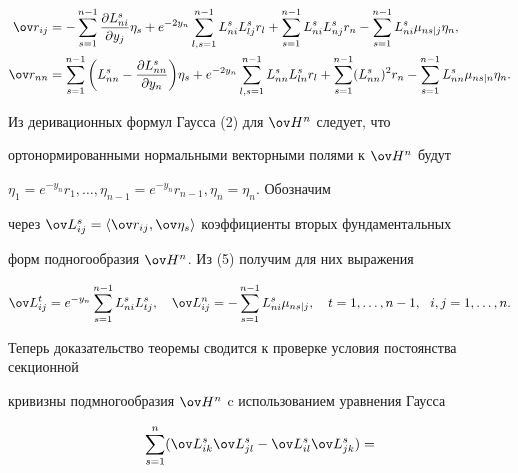 \begin{pf}
\begin{equation}
\begin{split}


\ov r_{ij}&=-\sum^{n-1}_{s=1}\frac{\partial L^s_{ni}}{\partial y_j}\eta_s


+e^{-2y_n}\sum_{l,s=1}^{n-1}L^s_{ni}L^s_{lj}r_l+\sum^{n-1}_{s=1}


L^s_{ni}L^s_{nj}r_n-\sum^{n-1}_{s=1}L^s_{ni}\mu_{ns|j}\eta_n,\\


%


\ov r_{nn}&=\sum^{n-1}_{s=1}\bigg(L^s_{nn}-


\frac{\partial L^s_{nn}}{\partial y_n}\bigg)\eta_s+


e^{-2y_n}\sum_{l,s=1}^{n-1}L^s_{nn}L^s_{ln}r_l+


\sum^{n-1}_{s=1}(L^s_{nn})^2 r_n-\sum_{s=1}^{n-1}L^s_{nn}\mu_{ns|n}\eta_n.


\end{split}


\end{equation}





Из деривационных формул Гаусса (2) для $\ov H{}^n$ следует, что 


ортонормированными нормальными векторными полями к $\ov H{}^n$ будут 


$\eta_1=e^{-y_n}r_1,\dotsc,\eta_{n-1}=e^{-y_n}r_{n-1},\eta_n=\eta_n$. Обозначим 


через $\ov L{}^s_{ij}=\la\ov r_{ij},\ov\eta_s\ra$ коэффициенты вторых фундаментальных 


форм подногообразия $\ov H{}^n$. Из (5) получим для них выражения


$$


\ov L{}^t_{ij}=e^{-y_n}\sum^{n-1}_{s=1}L^s_{ni}L^s_{tj},\quad


\ov L{}^n_{ij}=-\sum^{n-1}_{s=1}L^s_{ni}\mu_{ns|j},\quad


t=1,\dotsc,n-1,\ \ i,j=1,\dotsc,n.


$$





Теперь доказательство теоремы сводится к проверке условия постоянства секционной 


кривизны подмногообразия $\ov H{}^n$ c использованием уравнения Гаусса 


\begin{equation}


\sum^n_{s=1}(\ov L{}^s_{ik}\ov L{}^s_{jl}-\ov L{}^s_{il}\ov L{}^s_{jk})=



\end{equation}
\end{pf}
